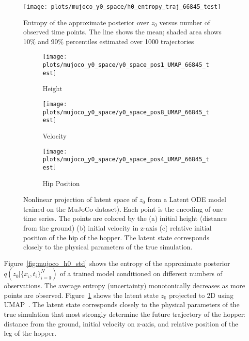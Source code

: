 \documentclass{article}
\begin{document}
\begin{figure}[h]
\centering
\begin{minipage}{.35\textwidth}
\centering
\texttt{[image: plots/mujoco\_y0\_space/h0\_entropy\_traj\_66845\_test]}
\caption{Entropy of the approximate posterior over $z_0$ versus number of observed time points. The line shows the mean; shaded area shows 10\% and 90\% percentiles estimated over 1000 trajectories}
\label{fig:mujoco_h0_std}
\end{minipage}
\hfill
\begin{minipage}{.62\textwidth}
	\begin{subfigure}[b]{0.32\linewidth}
	\centering
    \texttt{[image: plots/mujoco\_y0\_space/y0\_space\_pos1\_UMAP\_66845\_test]}
    \caption{Height}
    \end{subfigure}\begin{subfigure}[b]{0.32\linewidth}
	\centering
    \texttt{[image: plots/mujoco\_y0\_space/y0\_space\_pos8\_UMAP\_66845\_test]}
    \caption{Velocity}
	\end{subfigure}\begin{subfigure}[b]{0.32\linewidth}
	\centering
    \texttt{[image: plots/mujoco\_y0\_space/y0\_space\_pos4\_UMAP\_66845\_test]}
    \caption{Hip Position}
	\end{subfigure}
\caption{Nonlinear projection of latent space of $z_0$ from a Latent ODE model trained on the MuJoCo dataset).
Each point is the encoding of one time series.
The points are colored by the (a) initial height (distance from the ground) (b) initial velocity in z-axis (c) relative initial position of the hip of the hopper.
The latent state corresponds closely to the physical parameters of the true simulation.}
\label{fig:mujoco_h0space}
\end{minipage}
\vspace{-5mm}
\end{figure}


Figure~\ref{fig:mujoco_h0_std} shows the entropy of the approximate posterior $q(z_0| \{x_i,t_i\}_{i=0}^N)$ of a trained model conditioned on different numbers of observations. The average entropy (uncertainty) monotonically decreases as more points are observed.
Figure~\ref{fig:mujoco_h0space} shows the latent state $z_0$ projected to 2D using UMAP~\citep{umap}.
The latent state corresponds closely to the physical parameters of the true simulation that most strongly determine the future trajectory of the hopper: distance from the ground, initial velocity on z-axis, and relative position of the leg of the hopper.
\end{document}
